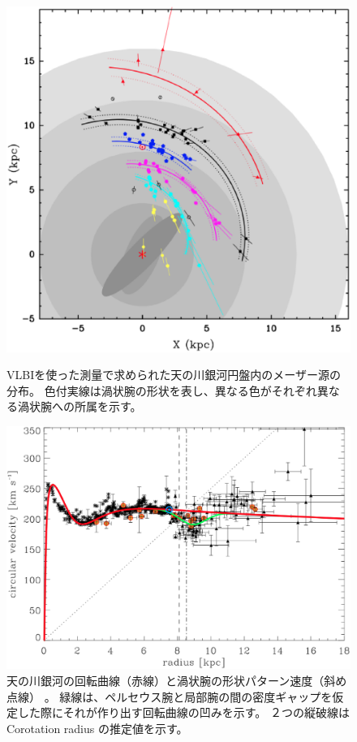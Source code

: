 \begin{figure}[t]
\begin{minipage}{8cm}
\includegraphics[width=0.9\linewidth]{astrometry/Reid_2014.eps} \vspace*{-3mm}
\caption{VLBIを使った測量で求められた天の川銀河円盤内のメーザー源の分布\citep{2014ApJ...783..130R}。
色付実線は渦状腕の形状を表し、異なる色がそれぞれ異なる渦状腕への所属を示す。 }
\label{c7.s3.f8}
\end{minipage}
\hspace{5mm}
\begin{minipage}{8cm}
\hspace*{-8mm}
\includegraphics[width=1.1\linewidth]{astrometry/Barros_2013_RotCurv.eps} \vspace*{-7mm}
\caption{天の川銀河の回転曲線（赤線）と渦状腕の形状パターン速度（斜め点線）\citep{2013MNRAS.435.2299B} 。
緑線は、ペルセウス腕と局部腕の間の密度ギャップを仮定した際にそれが作り出す回転曲線の凹みを示す。
２つの縦破線はCorotation radius の推定値を示す。}
\label{c7.s3.f9}
\end{minipage}
\end{figure}

